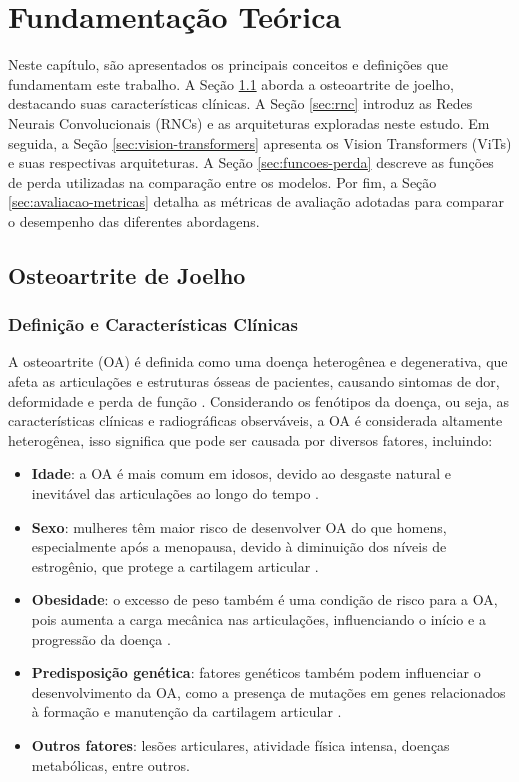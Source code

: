\chapter{Fundamentação Teórica}\label{cap:fundamentacao}

Neste capítulo, são apresentados os principais conceitos e definições que fundamentam este trabalho. A Seção \ref{sec:osteoartrite} aborda a osteoartrite de joelho, destacando suas características clínicas. A Seção \ref{sec:rnc} introduz as Redes Neurais Convolucionais (RNCs) e as arquiteturas exploradas neste estudo. Em seguida, a Seção \ref{sec:vision-transformers} apresenta os Vision Transformers (ViTs) e suas respectivas arquiteturas. A Seção \ref{sec:funcoes-perda} descreve as funções de perda utilizadas na comparação entre os modelos. Por fim, a Seção \ref{sec:avaliacao-metricas} detalha as métricas de avaliação adotadas para comparar o desempenho das diferentes abordagens.

\section{Osteoartrite de Joelho}\label{sec:osteoartrite}

\subsection{Definição e Características Clínicas}

A osteoartrite (OA) é definida como uma doença heterogênea e degenerativa, que afeta as articulações e estruturas ósseas de pacientes, causando sintomas de dor, deformidade e perda de função \citep{Loeser2012}. Considerando os fenótipos da doença, ou seja, as características clínicas e radiográficas observáveis, a OA é considerada altamente heterogênea, isso significa que pode ser causada por diversos fatores, incluindo:

\begin{itemize}
    \item \textbf{Idade}: a OA é mais comum em idosos, devido ao desgaste natural e inevitável das articulações ao longo do tempo \citep{ShaneAnderson2010}.
    \item \textbf{Sexo}: mulheres têm maior risco de desenvolver OA do que homens, especialmente após a menopausa, devido à diminuição dos níveis de estrogênio, que protege a cartilagem articular \citep{Tschon2021}.
    \item \textbf{Obesidade}: o excesso de peso também é uma condição de risco para a OA, pois aumenta a carga mecânica nas articulações, influenciando o início e a progressão da doença \citep{PACCA2018}.
    \item \textbf{Predisposição genética}: fatores genéticos também podem influenciar o desenvolvimento da OA, como a presença de mutações em genes relacionados à formação e manutenção da cartilagem articular \citep{Spector2004}.
    \item \textbf{Outros fatores}: lesões articulares, atividade física intensa, doenças metabólicas, entre outros.
\end{itemize}

